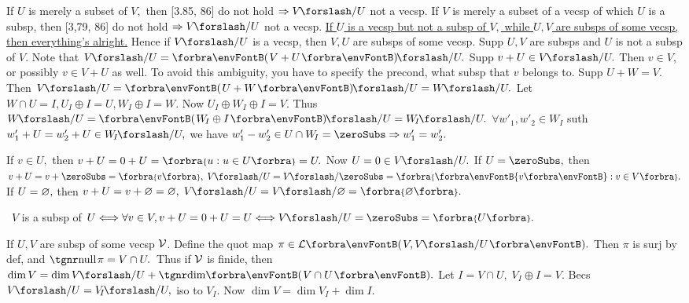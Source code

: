 \BulletPointX\NoteFor{[3.79, 3.83]}\TextB{}
If $U$ is merely a subset of $V,$ then [3.85, 86] do not hold $\Rightarrow V\XSlash U$ not a vecsp.\TextB{}
If $V$ is merely a subset of a vecsp of which $U$ is a subsp, then [3,79, 86] do not hold $\Rightarrow V\XSlash U$ not a vecsp.\TextB{}
\uline{If $U$ is a vecsp but not a subsp of $V,$ while $U,V$ are subsps of some vecsp, then everything's alright.}\TextB{}
Hence if $V\XSlash U$ is a vecsp, then $V,U$ are subsps of some vecsp.\TextB{}
\AComm Supp $U,V$ are subsps and $U$ is not a subsp of $V.$ Note that $V\XSlash U=\Par{V+U}\XSlash U.$\TextB{}
Supp $v+U\in V\XSlash U.$ Then $v\in V$, or possibly $v\in V+U$ as well. To avoid this ambiguity,\TextB{}
you have to specify the precond, what subsp that $v$ belongs to.\TextB{\vspace{2pt}}
\AExa Supp $U+W=V.$ Then $V\XSlash U=\Par{U+W}\XSlash U=W\XSlash U.$ Let $W\cap U=I,U_I\oplus I=U,W_{\!I}\oplus I=W.$\parExa{\IndentB}
Now $U_I\oplus W_{\!I}\oplus I=V.$ Thus $W\XSlash U=\Par{W_{\!I}\oplus I}\XSlash U=W_{\!I}\XSlash U.$\parExa{\IndentB}
$\forall w'_1,w'_2\in W_{\!I}$ suth $w'_1+U=w'_2+U\in W_{\!I}\XSlash U,$ we have $w'_1-w'_2\in U\cap W_{\!I}=\zeroSubs\Rightarrow w'_1=w'_2.$\par\vspace{4pt}
\;\;If $v\in U,$ then $v+U=0+U=\Bra{u:u\in U}=U.$ Now $U=0\in V\XSlash U.$\TextB{}
If $U=\zeroSubs,$ then $v+U=v+\zeroSubs=\Bra{v},\;V\XSlash U=V\XSlash\zeroSubs=\Bra{\Bra[\envFontB]{v}:v\in V}.$\TextB{}
If $U=\varnothing,$ then $v+U=v+\emptySet=\emptySet,\;V\XSlash U=V\XSlash\emptySet=\Bra{\emptySet}.$\par\vspace{2pt}
\BulletPointX{}\,\,\,$V$ is a subsp of $U\Longleftrightarrow\forall v\in V,v+U=0+U=U\Longleftrightarrow V\XSlash U=\zeroSubs=\Bra{U}.$
\SepLine

\BulletPointX\NoteForSmall{[3.88]}\;\;If $U,V$ are subsp of some vecsp $\mathcal{V}$. Define the quot map $\pi\in\Lm{V,V\XSlash U}.$\TextB{}
Then $\pi$ is surj by def, and $\null\pi=V\cap U.$ \,Thus if $\mathcal{V}$ is finide, then $\dim V=\dim V\XSlash U+\Dim\Par{V\cap U}.$\TextB{}
\Or Let $I=V\cap U,\;V_{\!I}\oplus I=V.$ Becs $V\XSlash U=V_{\!I}\XSlash U,$ iso to $V_{\!I}.$ Now $\dim V=\dim V_{\!I}+\dim I.$
\SepLine

